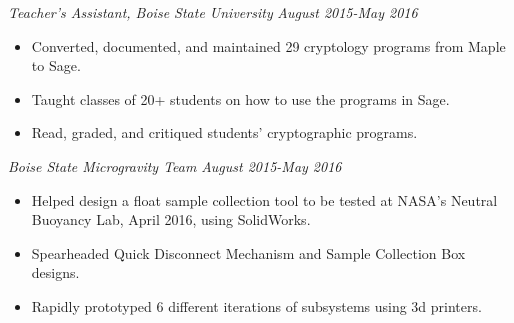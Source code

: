 \documentclass[letterpaper]{article}
\begin{document}
\vspace{.06in}
\begin{multicols}{2}
\textit{ Teacher's Assistant, Boise State University}
\vfill
\columnbreak
\textit{August 2015-May 2016}
\end{multicols}
\begin{itemize}
    \item Converted, documented, and maintained 29 cryptology programs from Maple to Sage.
    \item Taught classes of 20+ students on how to use the programs in Sage.
    \item Read, graded, and critiqued students' cryptographic programs.
\end{itemize}

\vspace{.06in}
\begin{multicols}{2}
\textit{Boise State Microgravity Team}
\vfill
\columnbreak
\textit{August 2015-May 2016}
\end{multicols}
\begin{itemize}
    \item Helped design a float sample collection tool to be tested at NASA's Neutral Buoyancy Lab, April 2016, using SolidWorks.
    \item Spearheaded Quick Disconnect Mechanism and Sample Collection Box designs. 
	\item Rapidly prototyped 6 different iterations of subsystems using 3d printers.
\end{itemize}
\end{document}
